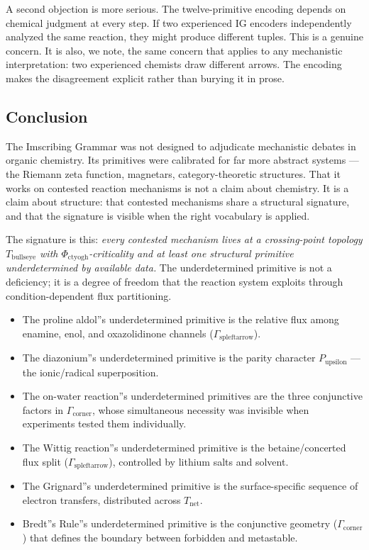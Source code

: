 \documentclass[12pt,a4paper]{article}
\begin{document}
A second objection is more serious. The twelve-primitive encoding depends on chemical judgment at every step. If two experienced IG encoders independently analyzed the same reaction, they might produce different tuples. This is a genuine concern. It is also, we note, the same concern that applies to any mechanistic interpretation: two experienced chemists draw different arrows. The encoding makes the disagreement explicit rather than burying it in prose.

\subsection{Conclusion}

The Imscribing Grammar was not designed to adjudicate mechanistic debates in organic chemistry. Its primitives were calibrated for far more abstract systems --- the Riemann zeta function, magnetars, category-theoretic structures. That it works on contested reaction mechanisms is not a claim about chemistry. It is a claim about structure: that contested mechanisms share a structural signature, and that the signature is visible when the right vocabulary is applied.

The signature is this: \emph{every contested mechanism lives at a crossing-point topology $T_{\text{bullseye}}$ with $\Phi_{\text{ctyogh}}$-criticality and at least one structural primitive underdetermined by available data.} The underdetermined primitive is not a deficiency; it is a degree of freedom that the reaction system exploits through condition-dependent flux partitioning.

\begin{itemize}
    \item The proline aldol''s underdetermined primitive is the relative flux among enamine, enol, and oxazolidinone channels ($\Gamma_{\text{spleftarrow}}$).
    \item The diazonium''s underdetermined primitive is the parity character $P_{\text{upsilon}}$ --- the ionic/radical superposition.
    \item The on-water reaction''s underdetermined primitives are the three conjunctive factors in $\Gamma_{\text{corner}}$, whose simultaneous necessity was invisible when experiments tested them individually.
    \item The Wittig reaction''s underdetermined primitive is the betaine/concerted flux split ($\Gamma_{\text{spleftarrow}}$), controlled by lithium salts and solvent.
    \item The Grignard''s underdetermined primitive is the surface-specific sequence of electron transfers, distributed across $T_\textrm{net}$.
    \item Bredt''s Rule''s underdetermined primitive is the conjunctive geometry ($\Gamma_{\text{corner}}$) that defines the boundary between forbidden and metastable.
\end{itemize}
\end{document}
